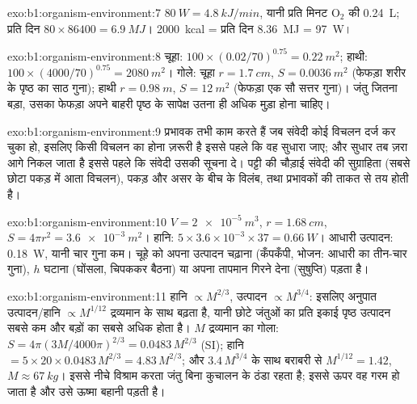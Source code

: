 \begin{solution}{exo:b1:organism-environment:7}
$\qty{80}{W} = \qty{4.8}{kJ/min}$, यानी प्रति मिनट $\mathrm{O_2}$ की
\qty{0.24}{L}; प्रति दिन $80\times 86400 = \qty{6.9}{MJ}$। \qty{2000}{kcal}
= प्रति दिन \qty{8.36}{MJ} = \qty{97}{W}।
\end{solution}

\begin{solution}{exo:b1:organism-environment:8}
चूहा: $100\times(0.02/70)^{0.75} = \qty{0.22}{m^2}$; हाथी:
$100\times(4000/70)^{0.75} = \qty{2080}{m^2}$। गोले: चूहा
$r = \qty{1.7}{cm}$, $S = \qty{0.0036}{m^2}$ (फेफड़ा शरीर के पृष्ठ का
साठ गुना); हाथी $r = \qty{0.98}{m}$, $S = \qty{12}{m^2}$ (फेफड़ा
एक सौ सत्तर गुना)। जंतु जितना बड़ा, उसका फेफड़ा अपने बाहरी पृष्ठ के
सापेक्ष उतना ही अधिक मुड़ा होना चाहिए।
\end{solution}

\begin{solution}{exo:b1:organism-environment:9}
प्रभावक तभी काम करते हैं जब संवेदी कोई विचलन दर्ज कर चुका हो, इसलिए किसी
विचलन का होना ज़रूरी है इससे पहले कि वह सुधारा जाए; और सुधार तब ज़रा आगे
निकल जाता है इससे पहले कि संवेदी उसकी सूचना दे। पट्टी की चौड़ाई संवेदी की
सुग्राहिता (सबसे छोटा पकड़ में आता विचलन), पकड़ और असर के बीच के विलंब,
तथा प्रभावकों की ताकत से तय होती है।
\end{solution}

\begin{solution}{exo:b1:organism-environment:10}
$V = \qty{2e-5}{m^3}$, $r = \qty{1.68}{cm}$, $S = 4\pi r^2 =
\qty{3.6e-3}{m^2}$। हानि: $5\times 3.6\times 10^{-3}\times 37 =
\qty{0.66}{W}$। आधारी उत्पादन: \qty{0.18}{W}, यानी चार गुना कम। चूहे को
अपना उत्पादन चढ़ाना (कँपकँपी, भोजन: आधारी का तीन-चार गुना), $h$ घटाना
(घोंसला, चिपककर बैठना) या अपना तापमान गिरने देना (सुषुप्ति) पड़ता है।
\end{solution}

\begin{solution}{exo:b1:organism-environment:11}
हानि $\propto M^{2/3}$, उत्पादन $\propto M^{3/4}$: इसलिए अनुपात
उत्पादन/हानि $\propto M^{1/12}$ द्रव्यमान के साथ बढ़ता है, यानी छोटे
जंतुओं का प्रति इकाई पृष्ठ उत्पादन सबसे कम और बड़ों का सबसे अधिक होता है।
$M$ द्रव्यमान का गोला: $S = 4\pi(3M/4000\pi)^{2/3} = \num{0.0483}\,M^{2/3}$ (SI);
हानि $= 5\times 20\times 0.0483\,M^{2/3} = 4.83\,M^{2/3}$; और
$3.4\,M^{3/4}$ के साथ बराबरी से $M^{1/12} = 1.42$, $M \approx \qty{67}{kg}$।
इससे नीचे विश्राम करता जंतु बिना कुचालन के ठंडा रहता है; इससे ऊपर वह गरम
हो जाता है और उसे ऊष्मा बहानी पड़ती है।
\end{solution}

